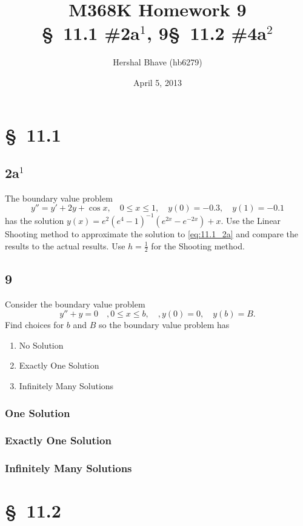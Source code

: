 \documentclass[12pt]{article}
\title{M368K Homework 9 \\
  \normalsize{\S~11.1 \#2a$^1$, 9\quad \S~11.2 \#4a$^2$}}
\author{Hershal Bhave (hb6279)}
\date{April 5, 2013}
\begin{document}
\maketitle

\section{\S~11.1}
\subsection{2a$^1$}
The boundary value problem 
\begin{equation}
  \label{eq:11.1_2a}
  y''=y'+2y+\cos x,\quad 0\leq x \leq 1,\quad y(0)=-0.3,\quad y(1)=-0.1
\end{equation}
has the solution $y(x)=e^2(e^4-1)^{-1}(e^{2x}-e^{-2x})+x$. Use the
Linear Shooting method to approximate the solution to
\cref{eq:11.1_2a} and compare the results to the actual results. 
Use $h=\frac{1}{2}$ for the Shooting method.

\subsection{9}
Consider the boundary value problem 
\begin{equation}
  \label{eq:11.1_9}
  y''+y=0\quad, 0\leq x\leq b,\quad, y(0)=0,\quad y(b)=B.
\end{equation}
Find choices for $b$ and $B$ so the boundary value problem has
\begin{enumerate}
\item No Solution
\item Exactly One Solution
\item Infinitely Many Solutions
\end{enumerate}
\subsubsection{One Solution}

\subsubsection{Exactly One Solution}

\subsubsection{Infinitely Many Solutions}

\section{\S~11.2}
\end{document}

